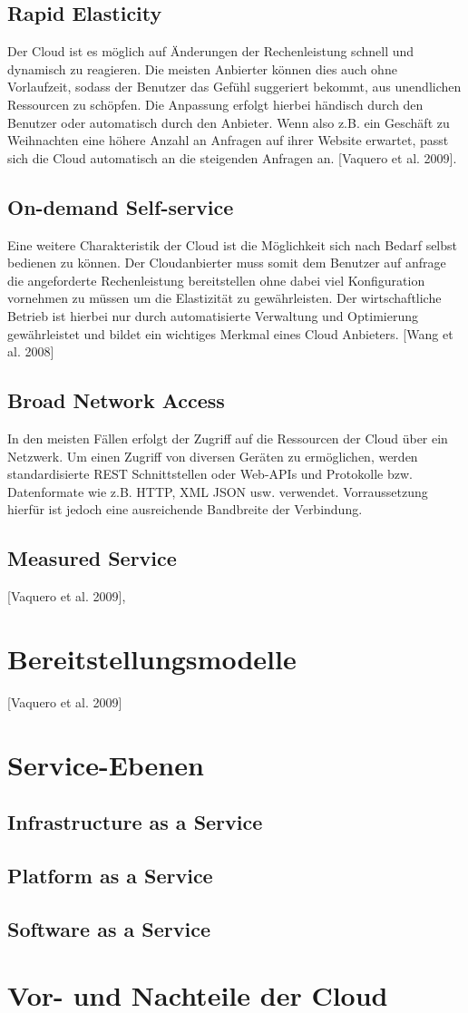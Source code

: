 \subsection{Rapid Elasticity}
Der Cloud ist es möglich auf Änderungen der Rechenleistung schnell und dynamisch zu reagieren. Die meisten Anbierter können dies auch ohne Vorlaufzeit, sodass der Benutzer das Gefühl suggeriert bekommt, aus unendlichen Ressourcen zu schöpfen. Die Anpassung erfolgt hierbei händisch durch den Benutzer oder automatisch durch den Anbieter. Wenn also z.B. ein Geschäft zu Weihnachten eine höhere Anzahl an Anfragen auf ihrer Website erwartet, passt sich die Cloud automatisch an die steigenden Anfragen an. 
[Vaquero et al. 2009].
\subsection{On-demand Self-service}
Eine weitere Charakteristik der Cloud ist die Möglichkeit sich nach Bedarf selbst bedienen  zu können. Der Cloudanbierter muss somit dem Benutzer auf anfrage die angeforderte Rechenleistung bereitstellen ohne dabei viel Konfiguration vornehmen zu müssen um die Elastizität zu gewährleisten. Der wirtschaftliche Betrieb ist hierbei nur durch automatisierte Verwaltung und Optimierung gewährleistet und bildet ein wichtiges Merkmal eines Cloud Anbieters.
[Wang et al. 2008]
\subsection{Broad Network Access}
In den meisten Fällen erfolgt der Zugriff auf die Ressourcen der Cloud über ein Netzwerk. Um einen Zugriff von diversen Geräten zu ermöglichen, werden standardisierte REST Schnittstellen oder Web-APIs und Protokolle bzw. Datenformate wie z.B. HTTP, XML JSON usw. verwendet. Vorraussetzung hierfür ist jedoch eine ausreichende Bandbreite der Verbindung.
\subsection{Measured Service}

[Vaquero et al. 2009],

\section{Bereitstellungsmodelle}
[Vaquero et al. 2009]

\section{Service-Ebenen}
\subsection{Infrastructure as a Service}
\subsection{Platform as a Service}
\subsection{Software as a Service}

\section{Vor- und Nachteile der Cloud}